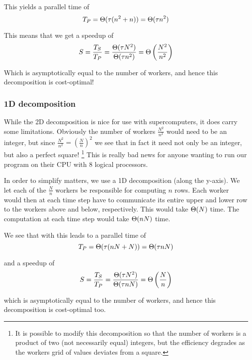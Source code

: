 This yields a parallel time of
\begin{equation}
T_P = \Theta(\tau(n^2 + n)) = \Theta(\tau n^2)
\end{equation}

This means that we get a speedup of
\begin{equation}
S = \frac{T_S}{T_P} = \frac{\Theta(\tau N^2)}{\Theta(\tau n^2)}
= \Theta\left( \frac{N^2}{n^2} \right)
\end{equation}

Which is asymptotically equal to the number of workers, and hence this decomposition is cost-optimal!

\subsubsection{1D decomposition}
\label{appx:parallel:analysis:1d}
While the 2D decomposition is nice for use with supercomputers, it does carry some limitations. Obviously the number of workers $\frac{N^2}{n^2}$ would need to be an integer, but since $\frac{N^2}{n^2} = \left(\frac{N}{n}\right)^2$ we see that in fact it need not only be an integer, but also a perfect square! \footnote{It is possible to modify this decomposition so that the number of workers is a product of two (not necessarily equal) integers, but the efficiency degrades as the workers grid of values deviates from a square.} This is really bad news for anyone wanting to run our program on their CPU with 8 logical processors.

In order to simplify matters, we use a 1D decomposition (along the y-axis). We let each of the $\frac{N}{n}$ workers be responsible for computing $n$ rows. Each worker would then at each time step have to communicate its entire upper and lower row to the workers above and below, respectively. This would take $\Theta(N)$ time. The computation at each time step would take $\Theta(nN)$ time.

We see that with this leads to a parallel time of
\begin{equation}
T_P = \Theta(\tau(nN + N)) = \Theta(\tau nN)
\end{equation}

and a speedup of
\begin{equation}
S = \frac{T_S}{T_P} = \frac{\Theta(\tau N^2)}{\Theta(\tau nN)}
= \Theta\left( \frac{N}{n} \right)
\end{equation}

which is asymptotically equal to the number of workers, and hence this decomposition is cost-optimal too.


